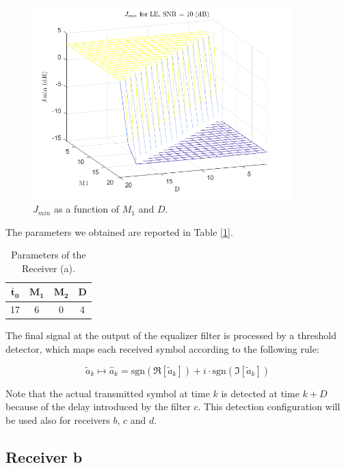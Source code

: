 \documentclass[a4paper, 12pt]{report}
\begin{document}
\begin{figure}[H]
	\centering
	\includegraphics[width=10cm]{images/optimal_params_LE}
	\caption{$J_{min}$ as a function of $M_1$ and $D$.}\label{j_min_le}
\end{figure}

The parameters we obtained are reported in Table [\ref{Tab_a}].

\begin{table}[H]
	\centering
	\begin{tabular}{c c c c}
		\toprule
		$\mathbf{\bar{t}_0}$ & $\mathbf{M_1}$ & $\mathbf{M_2}$ & \textbf{D}     \\
		\midrule
		17 & 6 & 0 & 4 \\
		\bottomrule			
	\end{tabular}
	\caption{Parameters of the Receiver (a).}
	\label{Tab_a}
\end{table}

The final signal at the output of the equalizer filter is processed by a threshold detector, which maps each received symbol according to the following rule:

\begin{equation*}
\tilde{a}_k \mapsto \hat{a}_k = \text{sgn}(\Re[\tilde{a}_k ]) +i \cdot \text{sgn}(\Im[\tilde{a}_k ])
\end{equation*}
 
Note that the actual transmitted symbol at time $k$ is detected at time $k+D$ because of the delay introduced by the filter $c$. This detection configuration will be used also for receivers $b$, $c$ and $d$. 

\clearpage

\subsection*{Receiver b}
\end{document}
